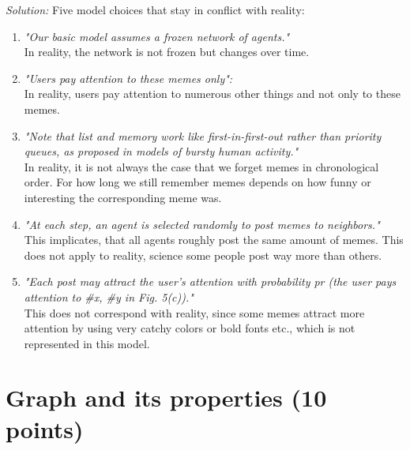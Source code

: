 \documentclass{WeSTassignment}
\begin{document}


\emph{Solution: }
Five model choices that stay in conflict with reality: 
\begin{enumerate}
	\item \textit{"Our basic model assumes a frozen network of agents."} \\
	In reality, the network is not frozen but changes over time. 
	\item \textit{"Users pay attention to these memes only":} \\
	In reality, users pay attention to numerous other things and not only to these memes. 
	\item \textit{"Note that list and memory work
like first-in-first-out rather than priority queues, as proposed in models of
bursty human activity."}\\
	In reality, it is not always the case that we forget memes in chronological order. For how long we still remember memes depends on how funny or interesting the corresponding meme was.
	\item \textit{"At each step, an agent is selected randomly to post memes to neighbors."} \\
	This implicates, that all agents roughly post the same amount of memes. This does not apply to reality, science some people post way more than others. 
	\item \textit{"Each post may attract the user’s attention with probability pr (the user pays attention to \#x, \#y in Fig. 5(c))."} \\
	This does not correspond with reality, since some memes attract more attention by using very catchy colors or bold fonts etc., which is not represented in this model. 
\end{enumerate}




\section{Graph and its properties (10 points)}
\end{document}
